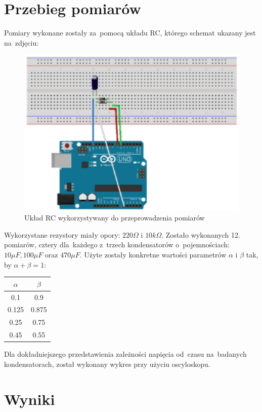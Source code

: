 \documentclass[12pt]{mwart}
\begin{document}
	\section{Przebieg pomiarów}
	\noindent Pomiary wykonane zostały za~pomocą układu RC, którego schemat ukazany jest na~zdjęciu:
	\begin{figure}[H]
		\centering
		\includegraphics[scale = 0.35]{schemat.jpg}
		\caption{Układ RC wykorzystywany do przeprowadzenia pomiarów}
	\end{figure}
	\noindent Wykorzystane rezystory miały opory: $220\Omega$ i $10k\Omega$.
	Zostało wykonanych 12. pomiarów, cztery dla~każdego z~trzech kondensatorów o~pojemnościach: $10\mu F, 100\mu F$ oraz $470\mu F$. Użyte zostały konkretne wartości parametrów $\alpha$ i $\beta$ tak, by $\alpha+\beta=1$:
	\begin{table}[H] %
		\centering
		\begin{tabular}{cc}
			\hline
			$\alpha$ & $\beta$ \\ \hline
			0.1 & 0.9  \\ \hline
			0.125 & 0.875  \\ \hline
			0.25 & 0.75 \\ \hline
			0.45 & 0.55  \\ \hline
		\end{tabular}
	\end{table}
	\noindent Dla dokładniejszego przedstawienia zależności napięcia od~czasu na~badanych kondensatorach, został wykonany wykres przy użyciu oscyloskopu.
	\section{Wyniki}
\end{document}

